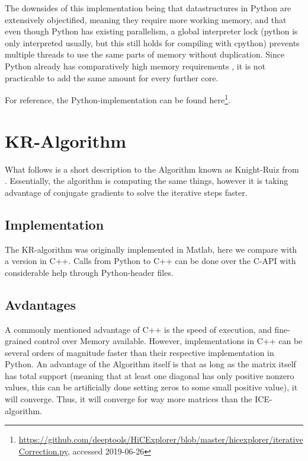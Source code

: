 The downsides of this implementation being that datastructures in Python are
extensively objectified, meaning they require more working memory, and that
even though Python has existing parallelism, a global interpreter lock (python
is only interpreted usually, but this still holds for compiling with cpython)
prevents multiple threads to use the same parts of memory without duplication.
Since Python already has comparatively high memory requirements , it is not practicable to add the same amount for every
further core.

For reference, the Python-implementation can be found
here\footnote{\url{https://github.com/deeptools/HiCExplorer/blob/master/hicexplorer/iterativeCorrection.py},
accessed 2019-06-26}.



\section{KR-Algorithm}\label{sec:KR}

What follows is a short description to the Algorithm known as Knight-Ruiz from
\cite{knight2013fast}. Essentially, the algorithm is computing the same things,
however it is taking advantage of conjugate gradients to solve the iterative
steps faster.

\subsection{Implementation}

The KR-algorithm was originally implemented in Matlab, here we compare with a
version in C++. Calls from Python to C++ can be done over the C-API with
considerable help through Python-header files.

\subsection{Avdantages}

A commonly mentioned advantage of C++ is the speed of execution, and
fine-grained control over Memory available. However, implementations in C++ can
be several orders of magnitude faster than their respective implementation in
Python. An advantage of the Algorithm itself is that as long as the matrix
itself has total support (meaning that at least one diagonal has only positive
nonzero values, this can be artificially done setting zeros to some small
positive value), it will converge. Thus, it will converge for way more matrices
than the ICE-algorithm.

